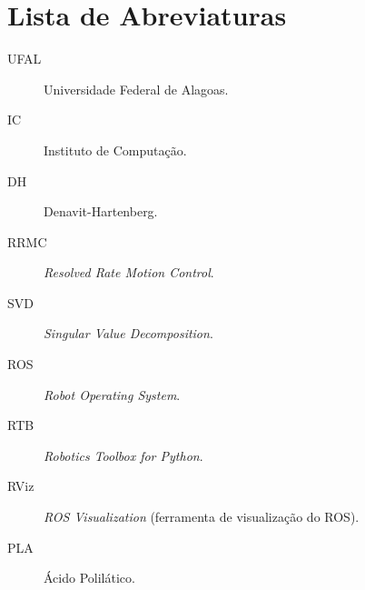 \chapter*{Lista de Abreviaturas}

\begin{description}
  \item[UFAL] \quad Universidade Federal de Alagoas.
  \item[IC] \quad Instituto de Computação.
  \item[DH] \quad Denavit-Hartenberg.
  \item[RRMC] \quad \emph{Resolved Rate Motion Control}.
  \item[SVD] \quad \emph{Singular Value Decomposition}.
  \item[ROS] \quad \emph{Robot Operating System}.
  \item[RTB] \quad \emph{Robotics Toolbox for Python}.
  \item[RViz] \quad \emph{ROS Visualization} (ferramenta de visualização do ROS).
  \item[PLA] \quad Ácido Polilático.
\end{description}